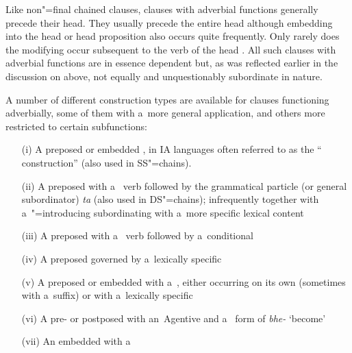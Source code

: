 Like non"=final chained clauses, clauses with adverbial functions generally precede their head. They usually precede the entire head  although embedding into the head  or head proposition also occurs quite frequently. Only rarely does the modifying  occur subsequent to the verb of the head . All such clauses with adverbial functions are in essence dependent but, as was reflected earlier in the discussion on  above, not equally and unquestionably subordinate in nature. 



A number of different construction types are available for clauses functioning adverbially, some of them with a~more general application, and others more restricted to certain subfunctions:


\begin{enumerate}
\item[(i)] A preposed or embedded   , in IA languages often referred to as the `` construction'' (also used in SS"=chains).

\item[(ii)] A preposed  with a~ verb followed by the grammatical particle (or general subordinator) \textit{ta} (also used in DS"=chains); infrequently together with a~"=introducing subordinating  with a~more specific lexical content

\item[(iii)] A preposed  with a~ verb followed by a~conditional 

\item[(iv)] A preposed   governed by a~lexically specific 

\item[(v)] A preposed or embedded  with a~, either occurring on its own (sometimes with a~suffix) or with a~lexically specific 

\item[(vi)] A pre- or postposed  with an~Agentive  and a~ form of \textit{bhe-} `become'

\item[(vii)] An embedded   with a~
\end{enumerate}

